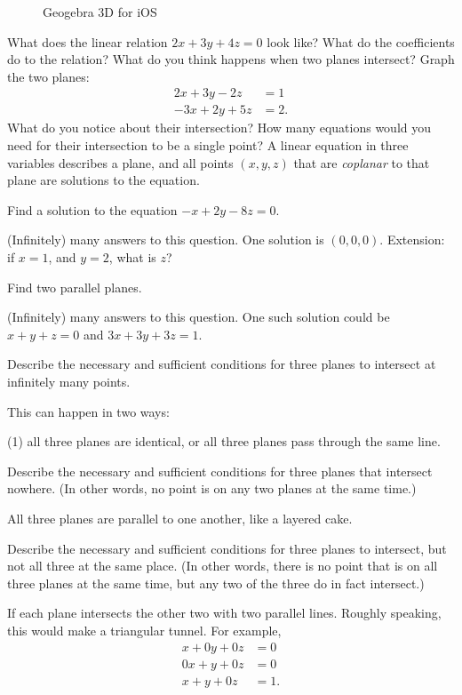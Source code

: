 \documentclass[12pt,fleqn]{book}
\newcommand{\prb}[1]{\begin{Exercise}#1\end{Exercise}}
\newcommand{\sol}[1]{\begin{Answer}#1\end{Answer}}
\begin{document}
\begin{figure}[h]
	\begin{minipage}{.5\textwidth}
		\centering
		\caption*{Geogebra 3D for Android}
	\end{minipage}%
	\begin{minipage}{.5\textwidth}
		\centering
		\caption*{Geogebra 3D for iOS}
	\end{minipage}
\end{figure}
\clearpage
What does the linear relation $2x+3y+4z=0$ look like?
\vfill
What do the coefficients do to the relation?
\vfill
What do you think happens when two planes intersect?
\vfill
Graph the two planes:
\begin{align*}
	2x+3y-2z  & =1  \\
	-3x+2y+5z & =2.
\end{align*}
What do you notice about their intersection?
\vfill
How many equations would you need for their intersection to be a single point?
\vfill
A linear equation in three variables describes a plane, and all points $(x,y,z)$ that are \emph{coplanar} to that plane are solutions to the equation.
\vfill
\clearpage
\prb{Find a solution to the equation $-x+2y-8z=0$.}
\sol{(Infinitely) many answers to this question.  One solution is $(0,0,0)$.  Extension: if $x=1$, and $y=2$, what is $z$?}
\vfill
\prb{
	Find two parallel planes.
}
\sol{(Infinitely) many answers to this question.  One such solution could be $x+y+z=0$ and $3x+3y+3z=1.$}
\vfill
\prb{Describe the necessary and sufficient conditions for three planes to intersect at infinitely many points.}
\sol{This can happen in two ways:
	\begin{tasks}(1)
		\task all three planes are identical, or
		\task all three planes pass through the same line.
	\end{tasks}
}
\vfill
\prb{Describe the necessary and sufficient conditions for three planes that intersect nowhere.  (In other words, no point is on any two planes at the same time.)
}
\sol{All three planes are parallel to one another, like a layered cake.}
\vfill
\clearpage
\prb{
	Describe the necessary and sufficient conditions for three planes to intersect, but not all three at the same place.  (In other words, there is no point that is on all three planes at the same time, but any two of the three do in fact intersect.)
}
\sol{If each plane intersects the other two with two parallel lines.  Roughly speaking, this would make a triangular tunnel.  For example,
	\begin{align*}
		x+0y+0z & =0  \\
		0x+y+0z & =0  \\
		x+y+0z  & =1.
	\end{align*}
}
\end{document}
